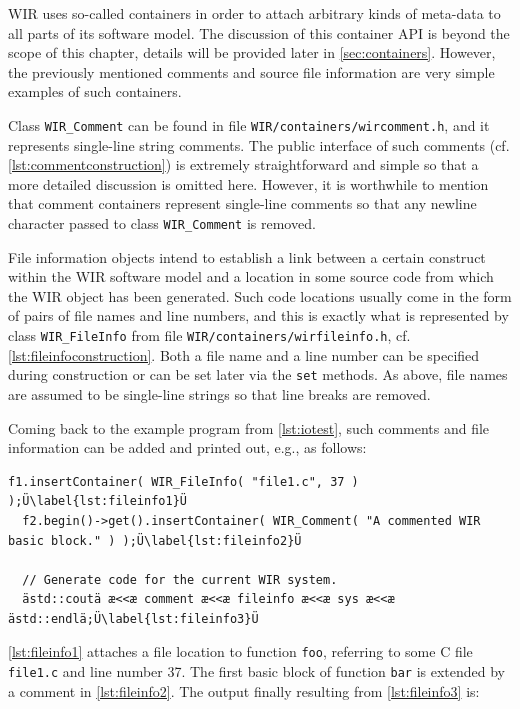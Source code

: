 \gls{WIR} uses so-called containers in order to attach arbitrary kinds of meta-data to all parts of its software model.
The discussion of this container \gls{API} is beyond the scope of this chapter, details will be provided later in \cref{sec:containers}.
However, the previously mentioned comments and source file information are very simple examples of such containers.

Class \texttt{WIR\_Comment} can be found in file \texttt{WIR/containers/wircomment.h}, and it represents single-line string comments.
The public interface of such comments (cf. \cref{lst:commentconstruction}) is extremely straightforward and simple so that a more detailed discussion is omitted here.
However, it is worthwhile to mention that comment containers represent single-line comments so that any newline character passed to class \texttt{WIR\_Comment} is removed.

File information objects intend to establish a link between a certain construct within the \gls{WIR} software model and a location in some source code from which the \gls{WIR} object has been generated.
Such code locations usually come in the form of pairs of file names and line numbers, and this is exactly what is represented by class \texttt{WIR\_FileInfo} from file \texttt{WIR/containers/wirfileinfo.h}, cf. \cref{lst:fileinfoconstruction}.
Both a file name and a line number can be specified during construction or can be set later via the \texttt{set} methods.
As above, file names are assumed to be single-line strings so that line breaks are removed.

Coming back to the example program from \cref{lst:iotest}, such comments and file information can be added and printed out, e.g., as follows:

\begin{lstlisting}[style=code,float=h,firstnumber=55]
  f1.insertContainer( WIR_FileInfo( "file1.c", 37 ) );Ü\label{lst:fileinfo1}Ü
  f2.begin()->get().insertContainer( WIR_Comment( "A commented WIR basic block." ) );Ü\label{lst:fileinfo2}Ü

  // Generate code for the current WIR system.
  ästd::coutä æ<<æ comment æ<<æ fileinfo æ<<æ sys æ<<æ ästd::endlä;Ü\label{lst:fileinfo3}Ü
\end{lstlisting}

\cref{lst:fileinfo1} attaches a file location to function \texttt{foo}, referring to some C file \texttt{file1.c} and line number 37.
The first basic block of function \texttt{bar} is extended by a comment in \cref{lst:fileinfo2}.
The output finally resulting from \cref{lst:fileinfo3} is:

